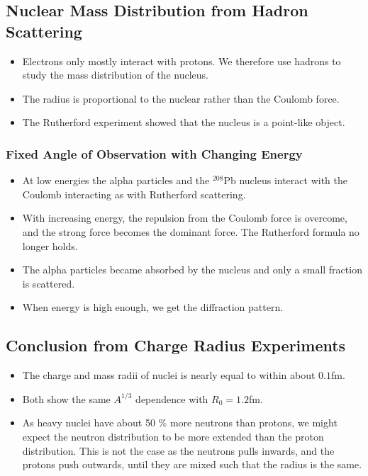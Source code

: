 \subsection{Nuclear Mass Distribution from Hadron Scattering}\label{subsec: Nuclear Mass Distribution from Hadron Scattering}
\begin{itemize}
    \item Electrons only mostly interact with protons. We therefore use hadrons to study the mass distribution of the nucleus.
    \item The radius is proportional to the nuclear rather than the Coulomb force. 
    \item The Rutherford experiment showed that the nucleus is a point-like object.
\end{itemize}

\subsubsection{Fixed Angle of Observation with Changing Energy}
\begin{itemize}
    \item At low energies the alpha particles and the $^{208}$Pb nucleus interact with the Coulomb interacting as with Rutherford scattering.
    \item With increasing energy, the repulsion from the Coulomb force is overcome, and the strong force becomes the dominant force. The Rutherford formula no longer holds. 
    \item The alpha particles became absorbed by the nucleus and only a small fraction is scattered. 
    \item When energy is high enough, we get the diffraction pattern.
\end{itemize}

\subsection{Conclusion from Charge Radius Experiments}
\begin{itemize}
    \item The charge and mass radii of nuclei is nearly equal to within about $0.1$fm. 
    \item Both show the same $A^{1/3}$ dependence with $R_0 = 1.2$fm. 
    \item As heavy nuclei have about 50 \% more neutrons than protons, we might expect the neutron distribution to be more extended than the proton distribution. This is not the case as the neutrons pulls inwards, and the protons push outwards, until they are mixed such that the radius is the same. 
\end{itemize}



